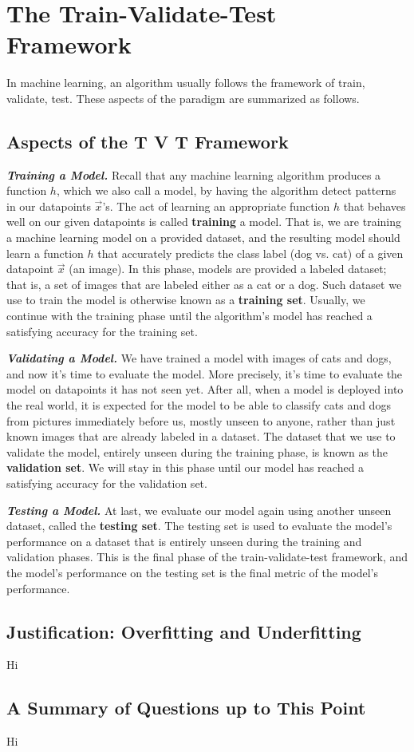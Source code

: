 \section{The Train-Validate-Test Framework}
In machine learning, an algorithm usually follows the framework of train, validate, test.
These aspects of the paradigm are summarized as follows.

\subsection{Aspects of the T V T Framework}
\textbf{\textit{Training a Model.}}
Recall that any machine learning algorithm produces a function $h$, which we also call a model, by having the algorithm detect patterns in our datapoints $\vec{x}$'s.
The act of learning an appropriate function $h$ that behaves well on our given datapoints is called \textbf{training} a model.
That is, we are training a machine learning model on a provided dataset, and the resulting model should learn a function $h$ that accurately predicts the class label (dog vs. cat) of a given datapoint $\vec{x}$ (an image).
In this phase, models are provided a labeled dataset; that is, a set of images that are labeled either as a cat or a dog.
Such dataset we use to train the model is otherwise known as a \textbf{training set}.
Usually, we continue with the training phase until the algorithm's model has reached a satisfying accuracy for the training set.

\textbf{\textit{Validating a Model.}}
We have trained a model with images of cats and dogs, and now it's time to evaluate the model.
More precisely, it's time to evaluate the model on datapoints it has not seen yet.
After all, when a model is deployed into the real world, it is expected for the model to be able to classify cats and dogs from pictures immediately before us, mostly unseen to anyone, rather than just known images that are already labeled in a dataset.
The dataset that we use to validate the model, entirely unseen during the training phase, is known as the \textbf{validation set}.
We will stay in this phase until our model has reached a satisfying accuracy for the validation set.

\textbf{\textit{Testing a Model.}}
At last, we evaluate our model again using another unseen dataset, called the \textbf{testing set}.
The testing set is used to evaluate the model's performance on a dataset that is entirely unseen during the training and validation phases.
This is the final phase of the train-validate-test framework, and the model's performance on the testing set is the final metric of the model's performance.

\subsection{Justification: Overfitting and Underfitting}
Hi

\subsection{A Summary of Questions up to This Point}
Hi
